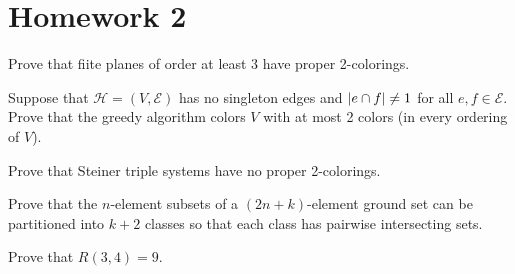 \documentclass[class=article, crop=false]{standalone}
\begin{document}
\section{Homework 2}
\begin{prob}
    Prove that fiite planes of order at least 3 have proper 2-colorings.
\end{prob}

\begin{prob}
    Suppose that $ \mathcal{H} = (V, \mathcal{E})$ has no singleton edges and $\left\lvert e \cap f \right\rvert \neq 1$ for all $e, f \in \mathcal{E}$. Prove that the greedy algorithm colors $V$ with at most 2 colors (in every ordering of $V$).
\end{prob}

\begin{prob}
    Prove that Steiner triple systems have no proper 2-colorings.
\end{prob}

\begin{prob}
    Prove that the $n$-element subsets of a $(2n+k)$-element ground set can be partitioned into $k+2$ classes so that each class has pairwise intersecting sets.
\end{prob}

\begin{prob}
    Prove that $R(3,4)=9$.
\end{prob}
\end{document}

